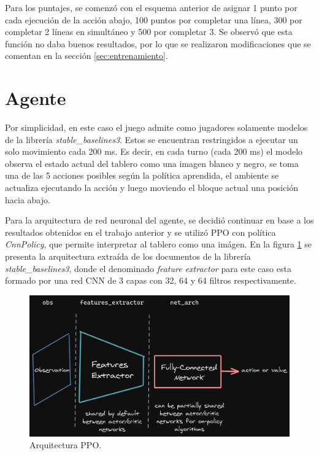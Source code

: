 Para los puntajes, se comenzó con el esquema anterior de asignar 1 punto por cada ejecución de la acción abajo, 100 puntos por completar una línea, 300 por completar 2 líneas en simultáneo y 500 por completar 3. Se observó que esta función no daba buenos resultados, por lo que se realizaron modificaciones que se comentan en la sección \ref{sec:entrenamiento}.

\section{Agente}
\label{sec:agente}

Por simplicidad, en este caso el juego admite como jugadores solamente modelos de la librería \textit{stable\_baselines3}. Estos se encuentran restringidos a ejecutar un solo movimiento cada 200 ms. Es decir, en cada turno (cada 200 ms) el modelo observa el estado actual del tablero como una imagen blanco y negro, se toma una de las 5 acciones posibles según la política aprendida, el ambiente se actualiza ejecutando la acción y luego moviendo el bloque actual una posición hacia abajo.

Para la arquitectura de red neuronal del agente, se decidió continuar en base a los resultados obtenidos en el trabajo anterior y se utilizó PPO con política \textit{CnnPolicy}, que permite interpretar al tablero como una imágen. En la figura \ref{fig:arquitectura} se presenta la arquitectura extraída de los documentos de la librería \textit{stable\_baselines3}, donde el denominado \textit{feature extractor} para este caso esta formado por una red CNN de 3 capas con 32, 64 y 64 filtros respectivamente.

\clearpage

\begin{figure}[hbt!]
	\centering
	\includegraphics[width=\textwidth]{./Figures/architecture.png}
	\caption{Arquitectura PPO.}
	\label{fig:arquitectura}
\end{figure}

